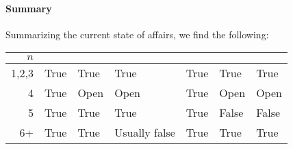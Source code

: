 
\paragraph{Summary}
Summarizing the current state of affairs, we find the following:

\begin{center}
    \begin{tabular}{
            r
            >{\centering\arraybackslash}p{1.1cm}%
            >{\centering\arraybackslash}p{1.1cm}%
            >{\centering\arraybackslash}p{1.8cm}%
            >{\centering\arraybackslash}p{1.1cm}%
            >{\centering\arraybackslash}p{1.1cm}%
            >{\centering\arraybackslash}p{1.1cm}}
            $n$& \tpoinc{} & \ppoinc{} & \spoinc{} & \tcob{} & \pcob{} & \scob{}\\ \midrule
            1,2,3 &
            True & 
            True & 
            True &  
            True & 
            True & 
            True  \\
            4 &
            True & 
            Open & 
            Open&  
            True & 
            Open& 
            Open \\
            5 &
            True & 
            True & 
            True &  
            True & 
            False& 
            False \\
            6+ &
            True & 
            True & 
            Usually false&  
            True & 
            True& 
            True\\
    \end{tabular}
\end{center}
